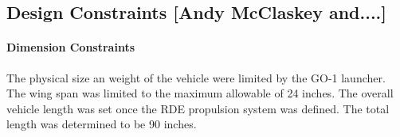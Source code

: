 \subsection{Design Constraints [Andy McClaskey and....]}
\paragraph{Dimension Constraints}The physical size an weight of the vehicle were limited by the GO-1 launcher. The wing span was limited to the maximum allowable of 24 inches. The overall vehicle length was set once the RDE propulsion system was defined. The total length was determined to be 90 inches.